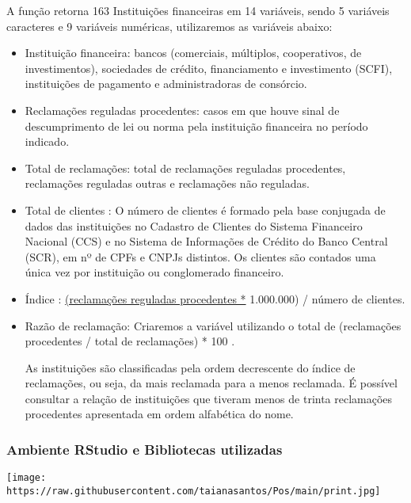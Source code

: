 \documentclass[
]{article}
\begin{document}
A função retorna 163 Instituições financeiras em 14 variáveis, sendo 5
variáveis caracteres e 9 variáveis numéricas, utilizaremos as variáveis
abaixo:

\begin{itemize}
\item
  Instituição financeira: bancos (comerciais, múltiplos, cooperativos,
  de investimentos), sociedades de crédito, financiamento e investimento
  (SCFI), instituições de pagamento e administradoras de consórcio.
\item
  Reclamações reguladas procedentes: casos em que houve sinal de
  descumprimento de lei ou norma pela instituição financeira no período
  indicado.
\item
  Total de reclamações: total de reclamações reguladas procedentes,
  reclamações reguladas outras e reclamações não reguladas.
\item
  Total de clientes : O número de clientes é formado pela base conjugada
  de dados das instituições no Cadastro de Clientes do Sistema
  Financeiro Nacional (CCS) e no Sistema de Informações de Crédito do
  Banco Central (SCR), em nº de CPFs e CNPJs distintos. Os clientes são
  contados uma única vez por instituição ou conglomerado financeiro.
\item
  Índice : \uline{(reclamações reguladas procedentes *} 1.000.000) /
  número de clientes.
\item
  Razão de reclamação: Criaremos a variável utilizando o total de
  (reclamações procedentes / total de reclamações) * 100 .

  As instituições são classificadas pela ordem decrescente do índice de
  reclamações, ou seja, da mais reclamada para a menos reclamada. É
  possível consultar a relação de instituições que tiveram menos de
  trinta reclamações procedentes apresentada em ordem alfabética do
  nome.
\end{itemize}

\hypertarget{ambiente-rstudio-e-bibliotecas-utilizadas}{%
\subsubsection{Ambiente RStudio e Bibliotecas
utilizadas}\label{ambiente-rstudio-e-bibliotecas-utilizadas}}

\texttt{[image: https://raw.githubusercontent.com/taianasantos/Pos/main/print.jpg]}
\end{document}
